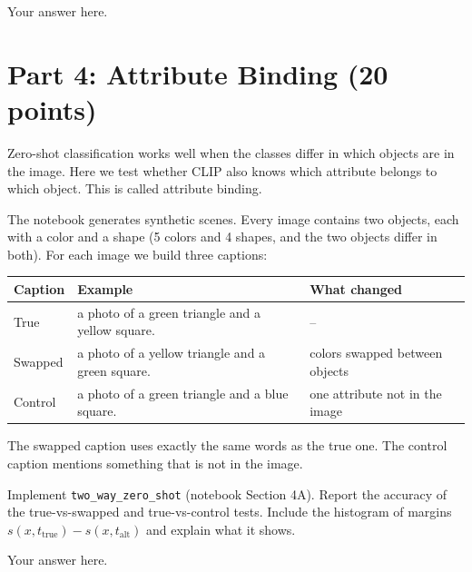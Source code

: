 \begin{solution}
Your answer here.
\end{solution}

\pagebreak
\section{Part 4: Attribute Binding (20 points)}

Zero-shot classification works well when the classes differ in which objects are in
the image. Here we test whether CLIP also knows which attribute belongs to which object.
This is called attribute binding.

The notebook generates synthetic scenes. Every image contains two objects, each with a
color and a shape (5 colors and 4 shapes, and the two objects differ in both). For each image
we build three captions:

\begin{center}
\begin{tabular}{lll}
\hline
Caption & Example & What changed \\
\hline
True & a photo of a green triangle and a yellow square. & -- \\
Swapped & a photo of a yellow triangle and a green square. & colors swapped between objects \\
Control & a photo of a green triangle and a blue square. & one attribute not in the image \\
\hline
\end{tabular}
\end{center}

\noindent
The swapped caption uses exactly the same words as the true one. The control caption
mentions something that is not in the image.

\begin{question}[10]
Implement \texttt{two\_way\_zero\_shot} (notebook Section 4A). Report the accuracy of the true-vs-swapped and true-vs-control tests. Include the
histogram of margins $s(x, t_\text{true}) - s(x, t_\text{alt})$ and explain what it
shows.
\end{question}

\begin{solution}
Your answer here.
\end{solution}

